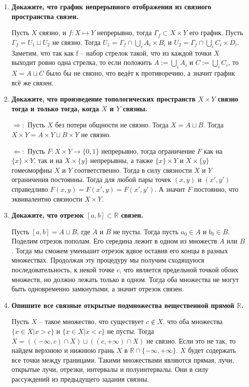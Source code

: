 \documentclass{article}
\begin{document}
\begin{enumerate}
    \item \textbf{Докажите, что график непрерывного отображения из связного
        пространства связен.} \par Пусть $X$ связно, и $f: X\mapsto Y$ непрерывно,
        тогда $\Gamma_f\subset X\times Y$ его график. Пусть $\Gamma_f=U_1\sqcup
        U_2$ не связно. Тогда $U_1=\Gamma_f\cap\bigcup_i A_i\times B_i$ и $U_2=
        \Gamma_f\cap\bigcup_iC_i\times D_i$. Заметим, что так как f – набор
        стрелок такой, что из каждой точки $X$ выходит ровно одна стрелка, то
        если положить $A:=\bigcup_i A_i$ и $C:=\bigcup_i C_i$, то $X=A\sqcup C$
        было бы не связно, что ведёт к противоречию, а значит график всё же
        связен.
    \item \textbf{Докажите, что произведение топологических пространств $X\times
        Y$ связно тогда и только тогда, когда $X$ и $Y$ связны.}\par
        $\Rightarrow:$ Пусть $X$ без потери общности не связно. Тогда $X=A\sqcup
        B$. Тогда $X\times Y = A\times Y\sqcup B\times Y$ не связно.\par
        $\Leftarrow:$ Пусть $F:X\times Y\longrightarrow \{0, 1\}$ непрерывно,
        тогда ограничение $F$ как на $\{x\}\times Y$, так и на $X\times \{y\}$
        непрерывны, а также $\{x\}\times Y$ и $X\times \{y\}$ гомеоморфны $X$ и
        $Y$ соответственно. Тогда в силу связности $X$ и $Y$ ограничения
        постоянны. Тогда для любой пары точек $(x,y)$ и $(x',y')$ справедливо
        $F(x,y)=F(x',y)=F(x',y')$. А значит $F$ постоянно, что эквивалентно
        связности $X\times Y$.
    \item \textbf{Докажите, что отрезок $[a, b]\subset \mathbb{R}$ связен.}\par
        Пусть $[a, b] = A\sqcup B$, где $A$ и $B$ не пусты. Тогда
        пусть $a_0\in A$ и $b_0\in B$. Поделим отрезок пополам. Его середина
        лежит в одном из множеств $A$ или $B$. Тогда мы сможем уменьшит отрезок
        вдвое оставив его концы в разных множествах. Продолжая эту процедуру мы
        получим сходящуюся последовательность, к некой точке $c$, что является
        предельной точкой обоих множеств, но должно лежать только в одном. Тогда
        оба множества не могут быть одновременно замкнутыми, а значит отрезок
        связен.
    \item \textbf{Опишите все связные открытые подмножества вещественной прямой
        $\mathbb{R}$.}\par
        Пусть $X$ – такое множество, что существует $c\notin X$, что оба
        множества $\{x\in X|x>c\}$ и $\{x\in X|x<c\}$ не пусты. Тогда $X=((-
        \infty,c)\cap X)\sqcup((c,+\infty)\cap X)$ не связно. Если это не так,
        то найдем верхнюю и нижнюю грань $X$ в $\mathbb{R}\cap\{-\infty,+\infty
        \}$. $X$ будет содержать все точки между границами.
        Такими множествами являются прямая, лучи, открытые лучи, отрезки,
        интервалы и полуинтервалы. Они в силу рассуждений из предыдущего
        задания связны.

        
\end{enumerate}
\end{document}
